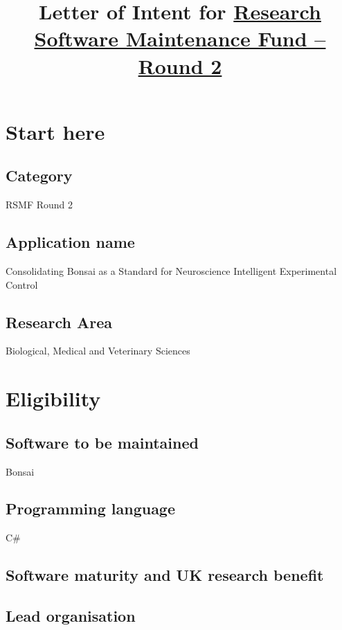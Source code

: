 \documentclass[12pt]{article}
\title{Letter of Intent for \href{https://www.software.ac.uk/research-software-maintenance-fund/round-2}{Research Software Maintenance Fund -- Round 2}}
\author{}
\begin{document}
\maketitle
\tableofcontents

\section{Start here}

\subsection{Category}

RSMF Round 2

\subsection{Application name}

Consolidating Bonsai as a Standard for Neuroscience Intelligent Experimental Control

\subsection{Research Area}

Biological, Medical and Veterinary Sciences

\pagebreak

\section{Eligibility}

\subsection{Software to be maintained}

Bonsai

\subsection{Programming language}

C\#

\subsection{Software maturity and UK research benefit}



\subsection{Lead organisation}
\end{document}
